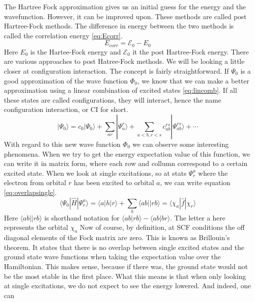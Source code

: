 \documentclass[twoside,twocolumn,9pt]{article}
\begin{document}
The Hartree Fock approximation gives us an initial guess for the energy and the wavefunction. However, it can be improved upon. These methods are called post Hartree-Fock methods. 
The difference in energy between the two methods is called the correlation energy \eqref{eq:Ecorr}.
\begin{equation}\label{eq:Ecorr}
    E_{corr} = \mathcal{E}_0 - E_0
\end{equation}
Here $E_0$ is the Hartee-Fock energy and $\mathcal{E}_0$ it the post Hartree-Fock energy. There are various approaches to post Hatree-Fock methods. We will be looking a little closer
at configuration interaction. The concept is fairly straightforward. If $\Psi_0$ is a good approximation of the wave function $\Phi_0$, we know that we can make a better approximation
using a linear combination of excited states \eqref{eq:lincomb}\cite{Szabo1996}. If all these states are called configurations, they will interact, hence the name configuration 
interaction, or CI for short.
\begin{equation}\label{eq:lincomb}
    |\Psi_0\rangle = c_0|\Psi_0\rangle + \sum_{ar}|\Psi_a^r\rangle + \sum_{a<b,r<s}c_{ab}^{rs}|\Psi^{rs}_{ab} \rangle + \cdots
\end{equation}
With regard to this new wave function $\Phi_0$ we can observe some interesting phenomena. When we try to get the energy expectation value of this function, we can write it in matrix
form, where each row and collumn correspond to a certain excited state. When we look at single excitations, so at stats $\Psi_r^a$ where the electron from orbital $r$ has been
excited to orbital $a$, we can write equation \eqref{eq:overlapsingle}\cite{Szabo1996}.
\begin{equation}\label{eq:overlapsingle}
  \langle\Psi_0 |\hat{H}|\Psi_r^a\rangle = \langle a|h|r \rangle + \sum_b \langle ab||rb \rangle = \langle \chi_a |\hat{f}| \chi_r \rangle
\end{equation}
Here $\langle ab||rb \rangle$ is shorthand notation for $\langle ab | rb \rangle - \langle ab | br \rangle$. The letter a here represents the orbital $\chi_a$ 
Now of course, by definition, at SCF conditions the off diagonal elements of the Fock matrix are zero. This is known as Brillouin's theorem. It states that there is no overlap 
between single excited states and the ground state wave functions when taking the expectation value over the Hamiltonian. This makes sense, because if there was, the ground state 
would not be the most stable in the first place. What this means is that when only looking at single excitations, we do not expect to see the energy lowered. And indeed, one can 
\end{document}
